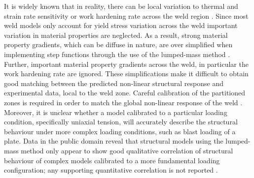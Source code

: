 It is widely known that in reality, there can be local variation to thermal and strain rate sensitivity or work hardening rate across the weld region \cite{Grujicic2011a,Genevois2006}. Since most weld models only account for yield stress variation across the weld important variation in material properties are neglected.
As a result, strong material property gradients, which can be diffuse in nature, are over simplified when implementing step functions through the use of the lumped-mass method \cite{McWilliams2013,Grujicic2011a}. Further, important material property gradients across the weld, in particular the work hardening rate are ignored. These simplifications make it difficult to obtain good matching between the predicted non-linear structural response and experimental data, local to the weld zone. Careful calibration of the partitioned zones is required in order to match the global non-linear response of the weld \cite{McWilliams2013,Grujicic2011a}. Moreover, it is unclear whether a model calibrated to a particular loading condition, specifically uniaxial tension, will accurately describe the structural behaviour under more complex loading conditions, such as blast loading of a plate. Data in the public domain reveal that structural models using the lumped-mass method only appear to show good qualitative correlation of structural behaviour of complex models calibrated to a more fundamental loading configuration; any supporting quantitative correlation is not reported \cite{McWilliams2013,Grujicic2011a}. 

